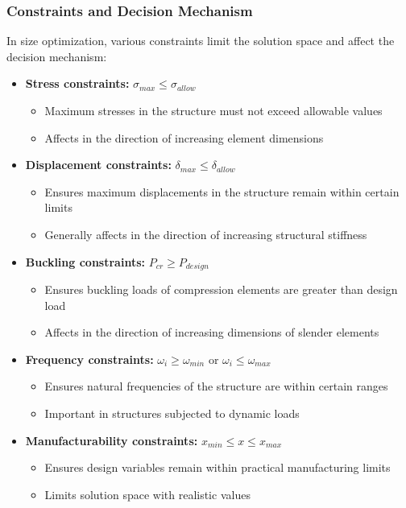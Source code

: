 \subsubsection{Constraints and Decision Mechanism}
In size optimization, various constraints limit the solution space and affect the decision mechanism:

\begin{itemize}
    \item \textbf{Stress constraints:} $\sigma_{max} \leq \sigma_{allow}$
    \begin{itemize}
        \item Maximum stresses in the structure must not exceed allowable values
        \item Affects in the direction of increasing element dimensions
    \end{itemize}
    
    \item \textbf{Displacement constraints:} $\delta_{max} \leq \delta_{allow}$
    \begin{itemize}
        \item Ensures maximum displacements in the structure remain within certain limits
        \item Generally affects in the direction of increasing structural stiffness
    \end{itemize}
    
    \item \textbf{Buckling constraints:} $P_{cr} \geq P_{design}$
    \begin{itemize}
        \item Ensures buckling loads of compression elements are greater than design load
        \item Affects in the direction of increasing dimensions of slender elements
    \end{itemize}
    
    \item \textbf{Frequency constraints:} $\omega_i \geq \omega_{min}$ or $\omega_i \leq \omega_{max}$
    \begin{itemize}
        \item Ensures natural frequencies of the structure are within certain ranges
        \item Important in structures subjected to dynamic loads
    \end{itemize}
    
    \item \textbf{Manufacturability constraints:} $x_{min} \leq x \leq x_{max}$
    \begin{itemize}
        \item Ensures design variables remain within practical manufacturing limits
        \item Limits solution space with realistic values
    \end{itemize}
    

\end{itemize}
